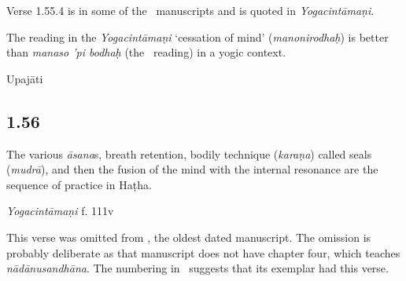 \begin{ekdosis}
\begin{testimonia}[hp01_055_4]
\end{testimonia}

\begin{philcomm}[hp01_055_4]
Verse 1.55.4 is in some of the \textdelta\ manuscripts and is quoted in \emph{Yogacintāmaṇi}.

The reading in the \emph{Yogacintāmaṇi} `cessation of mind' (\emph{manonirodhaḥ}) is better than \emph{manaso 'pi bodhaḥ} (the \textdelta\ reading) in a yogic context.
\end{philcomm}

\begin{metre}[hp01_055_4]
Upajāti
\end{metre}

\subsection*{1.56}
\begin{translation}[hp01_056]
The various \emph{āsana}s, breath retention, bodily technique (\emph{karaṇa}) called seals (\emph{mudrā}), and then the fusion of the mind with the internal resonance are the sequence of practice in Haṭha.%
\end{translation}

\begin{sources}[hp01_056]
\end{sources}

\begin{testimonia}[hp01_056]
\emph{Yogacintāmaṇi} f. 111v

\begin{versinnote}
\end{versinnote}

\end{testimonia}

\begin{philcomm}[hp01_056]
This verse was omitted from \etaOne, the oldest dated manuscript. The omission is probably deliberate as that manuscript does not have chapter four, which teaches \emph{nādānusandhāna}. The numbering in \etaOne\ suggests that its exemplar had this verse.


\end{philcomm}
\end{ekdosis}
